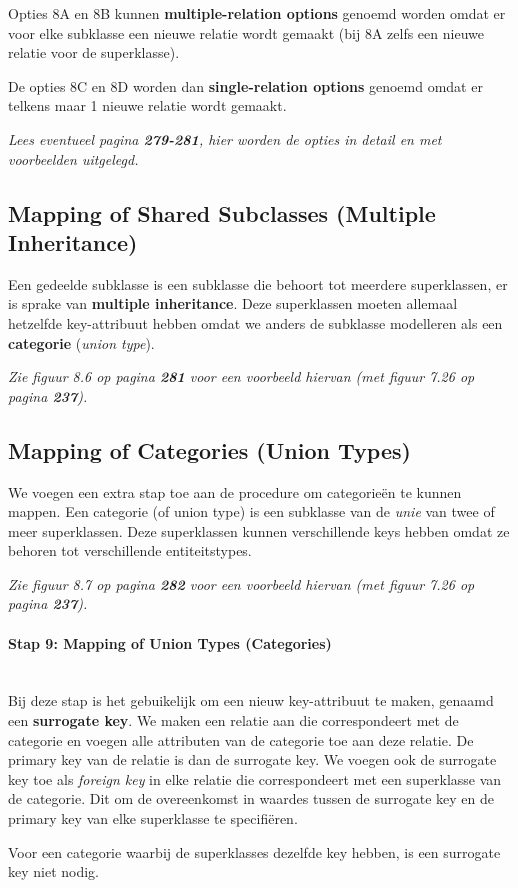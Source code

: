 \noindent Opties 8A en 8B kunnen \textbf{multiple-relation options} genoemd worden omdat er voor elke subklasse een nieuwe relatie wordt gemaakt (bij 8A zelfs een nieuwe relatie voor de superklasse).

De opties 8C en 8D worden dan \textbf{single-relation options} genoemd omdat er telkens maar 1 nieuwe relatie wordt gemaakt.

\textit{Lees eventueel pagina \textbf{279-281}, hier worden de opties in detail en met voorbeelden uitgelegd.}


\subsection{Mapping of Shared Subclasses (Multiple Inheritance)}
Een gedeelde subklasse is een subklasse die behoort tot meerdere superklassen, er is sprake van \textbf{multiple inheritance}. Deze superklassen moeten allemaal hetzelfde key-attribuut hebben omdat we anders de subklasse modelleren als een \textbf{categorie} (\textit{union type}).

\textit{Zie figuur 8.6 op pagina \textbf{281} voor een voorbeeld hiervan (met figuur 7.26 op pagina \textbf{237}).}


\subsection{Mapping of Categories (Union Types)}
We voegen een extra stap toe aan de procedure om categorie\"en te kunnen mappen. Een categorie (of union type) is een subklasse van de \textit{unie} van twee of meer superklassen. Deze superklassen kunnen verschillende keys hebben omdat ze behoren tot verschillende entiteitstypes.

\textit{Zie figuur 8.7 op pagina \textbf{282} voor een voorbeeld hiervan (met figuur 7.26 op pagina \textbf{237}).}

\paragraph{Stap 9: Mapping of Union Types (Categories)}~\vspace{2mm}\\
Bij deze stap is het gebuikelijk om een nieuw key-attribuut te maken, genaamd een \textbf{surrogate key}. We maken een relatie aan die correspondeert met de categorie en voegen alle attributen van de categorie toe aan deze relatie. De primary key van de relatie is dan de surrogate key. We voegen ook de surrogate key toe als \textit{foreign key} in elke relatie die correspondeert met een superklasse van de categorie. Dit om de overeenkomst in waardes tussen de surrogate key en de primary key van elke superklasse te specifi\"eren.

Voor een categorie waarbij de superklasses dezelfde key hebben, is een surrogate key niet nodig.